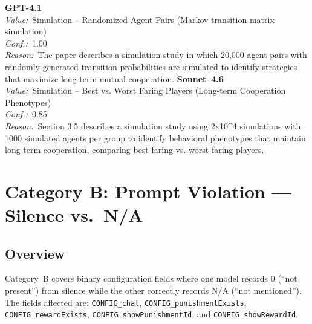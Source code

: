 \documentclass[11pt,a4paper]{article}
\begin{document}
\begin{tcolorbox}[
  title={\textbf{data\_id} \textbar{} DOI: 10.1098\_rsos.230867 \textbar{} Cond.~2},
  colback=blue!3!white,
  colframe=blue!45!black,
  fonttitle=\small\sffamily,
  sidebyside,
  sidebyside align=top seam,
  lower separated=false,
  breakable,
  before upper={\small},
  before lower={\small},
]
\textbf{GPT-4.1}\\[2pt]
\textit{Value:}~Simulation -- Randomized Agent Pairs (Markov transition matrix simulation)\\[3pt]
\textit{Conf.:}~1.00\\[3pt]
\textit{Reason:}~The paper describes a simulation study in which 20,000 agent pairs with randomly generated transition probabilities are simulated to identify strategies that maximize long-term mutual cooperation.
\tcblower
\textbf{Sonnet~4.6}\\[2pt]
\textit{Value:}~Simulation -- Best vs. Worst Faring Players (Long-term Cooperation Phenotypes)\\[3pt]
\textit{Conf.:}~0.85\\[3pt]
\textit{Reason:}~Section 3.5 describes a simulation study using 2x10\textasciicircum{}4 simulations with 1000 simulated agents per group to identify behavioral phenotypes that maintain long-term cooperation, comparing best-faring vs. worst-faring players.
\end{tcolorbox}



        \section{Category B: Prompt Violation --- Silence vs.\ N/A}

        \subsection{Overview}
        Category~B covers binary configuration fields where one model records
0 (``not present'') from silence while the other correctly records N/A
(``not mentioned'').  The fields affected are:
\texttt{CONFIG\_chat}, \texttt{CONFIG\_punishmentExists},
\texttt{CONFIG\_rewardExists}, \texttt{CONFIG\_showPunishmentId},
and \texttt{CONFIG\_showRewardId}.
\end{document}
